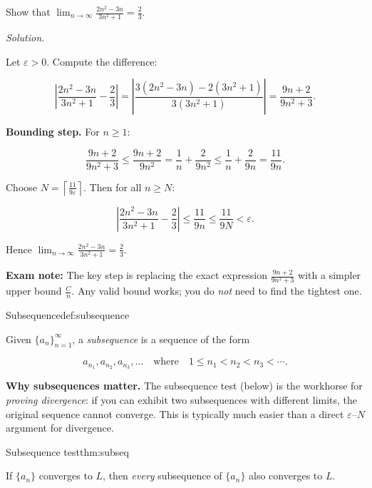 \begin{examplebox}[title={Worked Example (Tutorial 7, Question 1(c)): $\varepsilon$--$N$ proof for a rational sequence}]

Show that $\displaystyle \lim_{n\to\infty}\frac{2n^2-3n}{3n^2+1}=\frac{2}{3}$.

\emph{Solution.}

Let $\varepsilon>0$. Compute the difference:

\[
\left|\frac{2n^2-3n}{3n^2+1}-\frac{2}{3}\right|
=\left|\frac{3(2n^2-3n)-2(3n^2+1)}{3(3n^2+1)}\right|
=\frac{9n+2}{9n^2+3}.
\]

\textbf{Bounding step.} For $n\ge 1$:

\[
\frac{9n+2}{9n^2+3}\le \frac{9n+2}{9n^2}
=\frac{1}{n}+\frac{2}{9n^2}
\le \frac{1}{n}+\frac{2}{9n}
=\frac{11}{9n}.
\]

Choose $N=\left\lceil \frac{11}{9\varepsilon}\right\rceil$. Then for all $n\ge N$:

\[
\left|\frac{2n^2-3n}{3n^2+1}-\frac{2}{3}\right|\le \frac{11}{9n}\le \frac{11}{9N}<\varepsilon.
\]

Hence $\displaystyle \boxed{\lim_{n\to\infty}\frac{2n^2-3n}{3n^2+1}=\frac{2}{3}}$.

\textbf{Exam note:} The key step is replacing the exact expression $\frac{9n+2}{9n^2+3}$ with a simpler upper bound $\frac{C}{n}$. Any valid bound works; you do \emph{not} need to find the tightest one.

\end{examplebox}

\begin{definition}{Subsequence}{def:subsequence}

Given $\{a_n\}_{n=1}^{\infty}$, a \emph{subsequence} is a sequence of the form

\[
a_{n_1},a_{n_2},a_{n_3},\dots
\quad\text{where}\quad
1\le n_1<n_2<n_3<\cdots.
\]

\end{definition}

\noindent
\textbf{Why subsequences matter.}
The subsequence test (below) is the workhorse for \emph{proving divergence}: if you can exhibit two subsequences with different limits, the original sequence cannot converge.
This is typically much easier than a direct $\varepsilon$--$N$ argument for divergence.

\begin{theorem}{Subsequence test}{thm:subseq}

If $\{a_n\}$ converges to $L$, then \emph{every} subsequence of $\{a_n\}$ also converges to $L$.

\end{theorem}

